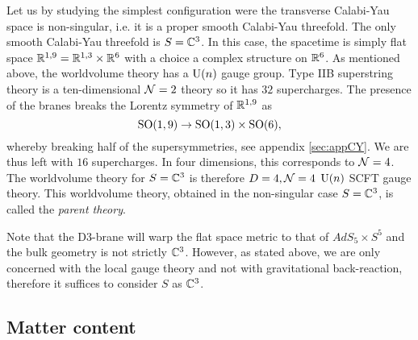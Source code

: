 \documentclass[a4paper,11pt]{article}
\begin{document}
        Let us by studying the simplest configuration were the transverse Calabi-Yau space is non-singular, i.e. it is a proper smooth Calabi-Yau threefold. The only smooth Calabi-Yau threefold is $S=\mathbb{C}^3$. In this case, the spacetime is simply flat space $\mathbb{R}^{1,9}=\mathbb{R}^{1,3}\times\mathbb{R}^6$ with a choice a complex structure on $\mathbb{R}^6$. As mentioned above, the worldvolume theory has a $\text{U}(n)$ gauge group. Type IIB superstring theory is a ten-dimensional $\mathcal{N}=2$ theory so it has $32$ supercharges. The presence of the branes breaks the Lorentz symmetry of $\mathbb{R}^{1,9}$ as
        \begin{equation}
            \text{SO}(1,9)\to\text{SO}(1,3)\times\text{SO}(6),
        \end{equation}
        whereby breaking half of the supersymmetries, see appendix \ref{sec:appCY}. We are thus left with $16$ supercharges. In four dimensions, this corresponds to $\mathcal{N}=4$. The worldvolume theory for $S=\mathbb{C}^3$ is therefore $D=4,\mathcal{N}=4$ $\text{U}(n)$ SCFT gauge theory. This worldvolume theory, obtained in the non-singular case $S=\mathbb{C}^3$, is called the \emph{parent theory}.

        Note that the D$3$-brane will warp the flat space metric to that of $AdS_5\times S^5$ and the bulk geometry is not strictly $\mathbb{C}^3$. However, as stated above, we are only concerned with the local gauge theory and not with gravitational back-reaction, therefore it suffices to consider $S$ as $\mathbb{C}^3$.

    \subsection{Matter content}
\end{document}
